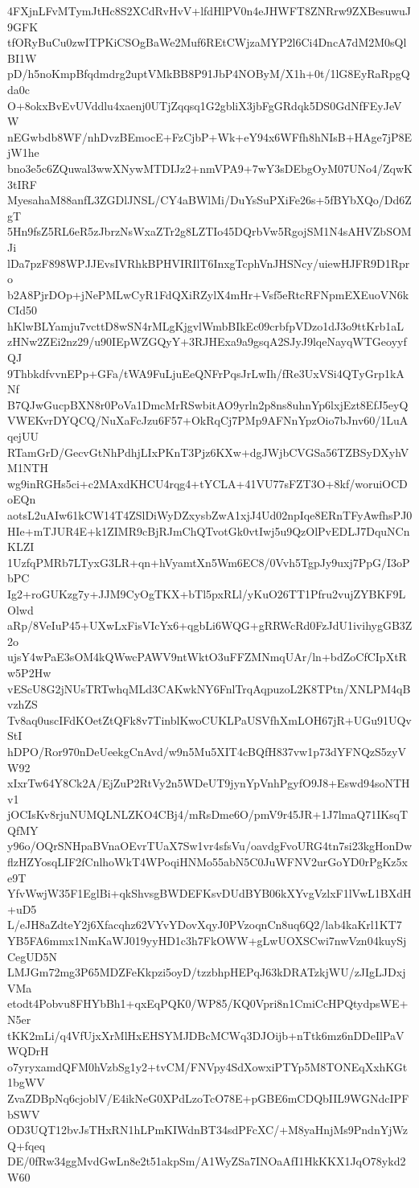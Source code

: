 4FXjnLFvMTymJtHc8S2XCdRvHvV+lfdHlPV0n4eJHWFT8ZNRrw9ZXBesuwuJ9GFK
tfORyBuCu0zwITPKiCSOgBaWe2Muf6REtCWjzaMYP2l6Ci4DncA7dM2M0sQlBI1W
pD/h5noKmpBfqdmdrg2uptVMkBB8P91JbP4NOByM/X1h+0t/1lG8EyRaRpgQda0c
O+8okxBvEvUVddlu4xaenj0UTjZqqsq1G2gbliX3jbFgGRdqk5DS0GdNfFEyJeVW
nEGwbdb8WF/nhDvzBEmocE+FzCjbP+Wk+eY94x6WFfh8hNIsB+HAge7jP8EjW1he
bno3e5c6ZQuwal3wwXNywMTDIJz2+nmVPA9+7wY3sDEbgOyM07UNo4/ZqwK3tIRF
MyesahaM88anfL3ZGDlJNSL/CY4aBWlMi/DuYsSuPXiFe26s+5fBYbXQo/Dd6ZgT
5Hn9fsZ5RL6eR5zJbrzNsWxaZTr2g8LZTIo45DQrbVw5RgojSM1N4sAHVZbSOMJi
lDa7pzF898WPJJEvsIVRhkBPHVIRIlT6InxgTcphVnJHSNcy/uiewHJFR9D1Rpro
b2A8PjrDOp+jNePMLwCyR1FdQXiRZylX4mHr+Vsf5eRtcRFNpmEXEuoVN6kCId50
hKlwBLYamju7vcttD8wSN4rMLgKjgvlWmbBIkEc09crbfpVDzo1dJ3o9ttKrb1aL
zHNw2ZEi2nz29/u90IEpWZGQyY+3RJHExa9a9gsqA2SJyJ9lqeNayqWTGeoyyfQJ
9ThbkdfvvnEPp+GFa/tWA9FuLjuEeQNFrPqsJrLwIh/fRe3UxVSi4QTyGrp1kANf
B7QJwGucpBXN8r0PoVa1DmcMrRSwbitAO9yrln2p8ns8uhnYp6lxjEzt8EfJ5eyQ
VWEKvrDYQCQ/NuXaFcJzu6F57+OkRqCj7PMp9AFNnYpzOio7bJnv60/1LuAqejUU
RTamGrD/GecvGtNhPdhjLIxPKnT3Pjz6KXw+dgJWjbCVGSa56TZBSyDXyhVM1NTH
wg9inRGHs5ci+c2MAxdKHCU4rqg4+tYCLA+41VU77sFZT3O+8kf/woruiOCDoEQn
aotsL2uAIw61kCW14T4ZSlDiWyDZxysbZwA1xjJ4Ud02npIqe8ERnTFyAwfhsPJ0
HIe+mTJUR4E+k1ZIMR9cBjRJmChQTvotGk0vtIwj5u9QzOlPvEDLJ7DquNCnKLZI
1UzfqPMRb7LTyxG3LR+qn+hVyamtXn5Wm6EC8/0Vvh5TgpJy9uxj7PpG/I3oPbPC
Ig2+roGUKzg7y+JJM9CyOgTKX+bTl5pxRLl/yKuO26TT1Pfru2vujZYBKF9LOlwd
aRp/8VeIuP45+UXwLxFisVIcYx6+qgbLi6WQG+gRRWcRd0FzJdU1ivihygGB3Z2o
ujsY4wPaE3sOM4kQWwcPAWV9ntWktO3uFFZMNmqUAr/ln+bdZoCfCIpXtRw5P2Hw
vEScU8G2jNUsTRTwhqMLd3CAKwkNY6FnlTrqAqpuzoL2K8TPtn/XNLPM4qBvzhZS
Tv8aq0uscIFdKOetZtQFk8v7TinblKwoCUKLPaUSVfhXmLOH67jR+UGu91UQvStI
hDPO/Ror970nDeUeekgCnAvd/w9n5Mu5XIT4cBQfH837vw1p73dYFNQzS5zyVW92
xIxrTw64Y8Ck2A/EjZuP2RtVy2n5WDeUT9jynYpVnhPgyfO9J8+Eswd94soNTHv1
jOCIsKv8rjuNUMQLNLZKO4CBj4/mRsDme6O/pmV9r45JR+1J7lmaQ71IKsqTQfMY
y96o/OQrSNHpaBVnaOEvrTUaX7Sw1vr4sfsVu/oavdgFvoURG4tn7si23kgHonDw
flzHZYosqLIF2fCnlhoWkT4WPoqiHNMo55abN5C0JuWFNV2urGoYD0rPgKz5xe9T
YfvWwjW35F1EglBi+qkShvsgBWDEFKsvDUdBYB06kXYvgVzlxF1lVwL1BXdH+uD5
L/eJH8aZdteY2j6Xfacqhz62VYvYDovXqyJ0PVzoqnCn8uq6Q2/lab4kaKrl1KT7
YB5FA6mmx1NmKaWJ019yyHD1c3h7FkOWW+gLwUOXSCwi7nwVzn04kuySjCegUD5N
LMJGm72mg3P65MDZFeKkpzi5oyD/tzzbhpHEPqJ63kDRATzkjWU/zJIgLJDxjVMa
etodt4Pobvu8FHYbBh1+qxEqPQK0/WP85/KQ0Vpri8n1CmiCcHPQtydpsWE+N5er
tKK2mLi/q4VfUjxXrMlHxEHSYMJDBcMCWq3DJOijb+nTtk6mz6nDDeIlPaVWQDrH
o7yryxamdQFM0hVzbSg1y2+tvCM/FNVpy4SdXowxiPTYp5M8TONEqXxhKGt1bgWV
ZvaZDBpNq6cjoblV/E4ikNeG0XPdLzoTcO78E+pGBE6mCDQbIIL9WGNdcIPFbSWV
OD3UQT12bvJsTHxRN1hLPmKIWdnBT34sdPFcXC/+M8yaHnjMs9PndnYjWzQ+fqeq
DE/0fRw34ggMvdGwLn8e2t51akpSm/A1WyZSa7INOaAfI1HkKKX1JqO78ykd2W60
